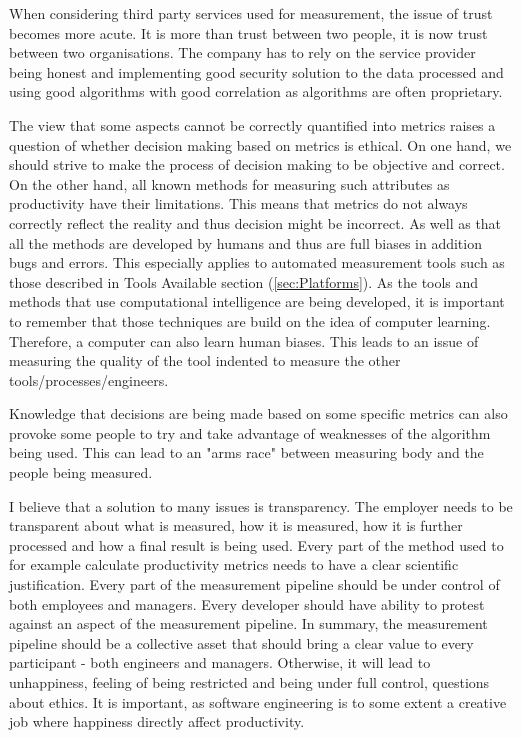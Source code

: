 \documentclass[11pt]{article}
\begin{document}
\par 
When considering third party services used for measurement, the issue of trust becomes more acute. It is more than trust between two people, it is now trust between two organisations. The company has to rely on the service provider being honest and implementing good security solution to the data processed and using good algorithms with good correlation as algorithms are often proprietary.
\par                
The view that some aspects cannot be correctly quantified into metrics raises a question of whether decision making based on metrics is ethical. On one hand, we should strive to make the process of decision making to be objective and correct. On the other hand, all known methods for measuring such attributes as productivity have their limitations. This means that metrics do not always correctly reflect the reality and thus decision might be incorrect. As well as that all the methods are developed by humans and thus are full biases in addition bugs and errors. This especially applies to automated measurement tools such as those described in Tools Available section (\ref{sec:Platforms}). As the tools and methods that use computational intelligence are being developed, it is important to remember that those techniques are build on the idea of computer learning. Therefore, a computer can also learn human biases. This leads to an issue of measuring the quality of the tool indented to measure the other tools/processes/engineers.

Knowledge that decisions are being made based on some specific metrics can also provoke some people to try and take advantage of weaknesses of the algorithm being used. This can lead to an "arms race" between measuring body and the people being measured. 

I believe that a solution to many issues is transparency. The employer needs to be transparent about what is measured, how it is measured, how it is further processed and how a final result is being used. Every part of the method used to for example calculate productivity metrics needs to have a clear scientific justification. Every part of the measurement pipeline should be under control of both employees and managers. Every developer should have ability to protest against an aspect of the measurement pipeline. In summary, the measurement pipeline should be a collective asset that should bring a clear value to every participant - both engineers and managers. Otherwise, it will lead to unhappiness, feeling of being restricted and being under full control, questions about ethics. It is important, as software engineering is to some extent a creative job where happiness directly affect productivity.\cite{Graziotin2019}
\end{document}
